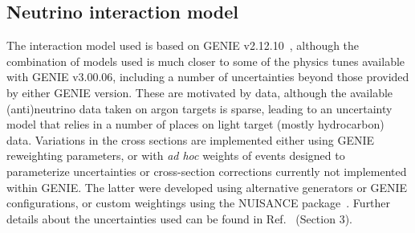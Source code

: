 \subsection{Neutrino interaction model}
The interaction model used is based on GENIE v2.12.10~\cite{Andreopoulos:2009rq,Andreopoulos:2015wxa}, although the combination of models used is much closer to some of the physics tunes available with GENIE v3.00.06, including a number of uncertainties beyond those provided by either GENIE version. These are motivated by data, although the available (anti)neutrino data taken on argon targets is sparse, leading to an uncertainty model that relies in a number of places on light target (mostly hydrocarbon) data. Variations in the cross sections are implemented either using GENIE reweighting parameters, or with {\em ad hoc} weights of events designed to parameterize uncertainties or cross-section corrections currently not implemented within GENIE. The latter were developed using alternative generators or GENIE configurations, or custom weightings using the NUISANCE package~\cite{Stowell:2016jfr}. Further details about the uncertainties used can be found in Ref.~\cite{Abi:2020qib} (Section 3).

